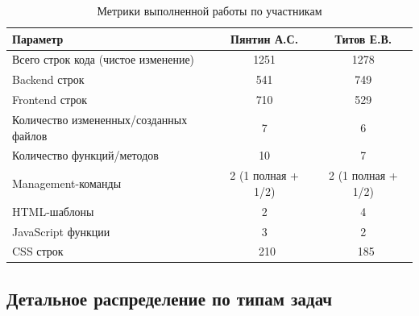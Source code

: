 \documentclass[a4paper,12pt]{article}
\begin{document}
\begin{table}[H]
\centering
\caption{Метрики выполненной работы по участникам}
\begin{tabular}{|l|c|c|}
\hline
\textbf{Параметр} & \textbf{Пянтин А.С.} & \textbf{Титов Е.В.} \\
\hline
Всего строк кода (чистое изменение) & 1251 & 1278 \\
\hline
Backend строк & 541 & 749 \\
\hline
Frontend строк & 710 & 529 \\
\hline
Количество измененных/созданных файлов & 7 & 6 \\
\hline
Количество функций/методов & 10 & 7 \\
\hline
Management-команды & 2 (1 полная + 1/2) & 2 (1 полная + 1/2) \\
\hline
HTML-шаблоны & 2 & 4 \\
\hline
JavaScript функции & 3 & 2 \\
\hline
CSS строк & ~210 & ~185 \\
\hline
\end{tabular}
\label{tab:participant_metrics}
\end{table}

\subsection{Детальное распределение по типам задач}
\end{document}
